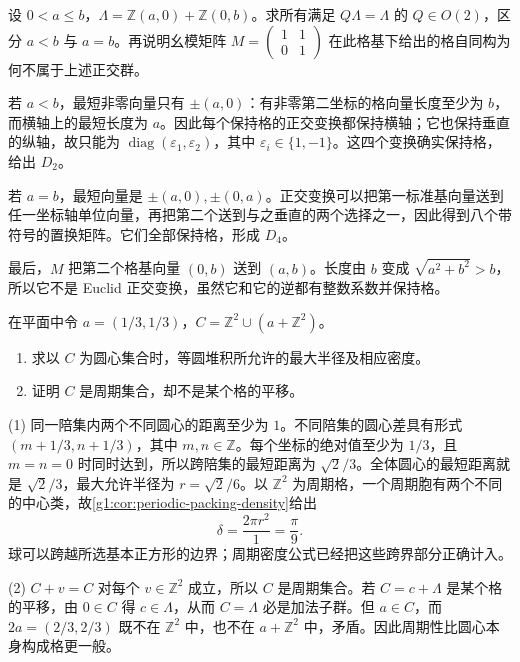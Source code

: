 \begin{exercise}
	\label{g1:ex:rectangular-lattice-point-group}
	设 \(0<a\le b\)，\(\Lambda=\mathbb Z(a,0)+\mathbb Z(0,b)\)。求所有满足 \(Q\Lambda=\Lambda\) 的 \(Q\in O(2)\)，区分 \(a<b\) 与 \(a=b\)。再说明幺模矩阵 \(M=\left(\begin{smallmatrix}1&1\\0&1\end{smallmatrix}\right)\) 在此格基下给出的格自同构为何不属于上述正交群。
\end{exercise}
\begin{solution}
	若 \(a<b\)，最短非零向量只有 \(\pm(a,0)\)：有非零第二坐标的格向量长度至少为 \(b\)，而横轴上的最短长度为 \(a\)。因此每个保持格的正交变换都保持横轴；它也保持垂直的纵轴，故只能为 \(\operatorname{diag}(\varepsilon_1,\varepsilon_2)\)，其中 \(\varepsilon_i\in\{1,-1\}\)。这四个变换确实保持格，给出 \(D_2\)。

	若 \(a=b\)，最短向量是 \(\pm(a,0),\pm(0,a)\)。正交变换可以把第一标准基向量送到任一坐标轴单位向量，再把第二个送到与之垂直的两个选择之一，因此得到八个带符号的置换矩阵。它们全部保持格，形成 \(D_4\)。

	最后，\(M\) 把第二个格基向量 \((0,b)\) 送到 \((a,b)\)。长度由 \(b\) 变成 \(\sqrt{a^2+b^2}>b\)，所以它不是 Euclid 正交变换，虽然它和它的逆都有整数系数并保持格。
\end{solution}

\begin{exercise}
	\label{g1:ex:periodic-nonlattice-packing}
	在平面中令 \(a=(1/3,1/3)\)，\(C=\mathbb Z^2\cup(a+\mathbb Z^2)\)。
	\begin{enumerate}
		\item 求以 \(C\) 为圆心集合时，等圆堆积所允许的最大半径及相应密度。
		\item 证明 \(C\) 是周期集合，却不是某个格的平移。
	\end{enumerate}
\end{exercise}
\begin{solution}
	(1) 同一陪集内两个不同圆心的距离至少为 \(1\)。不同陪集的圆心差具有形式 \((m+1/3,n+1/3)\)，其中 \(m,n\in\mathbb Z\)。每个坐标的绝对值至少为 \(1/3\)，且 \(m=n=0\) 时同时达到，所以跨陪集的最短距离为 \(\sqrt2/3\)。全体圆心的最短距离就是 \(\sqrt2/3\)，最大允许半径为 \(r=\sqrt2/6\)。以 \(\mathbb Z^2\) 为周期格，一个周期胞有两个不同的中心类，故\cref{g1:cor:periodic-packing-density}给出
	\[
		\delta=\frac{2\pi r^2}{1}=\frac\pi9.
	\]
	球可以跨越所选基本正方形的边界；周期密度公式已经把这些跨界部分正确计入。

	(2) \(C+v=C\) 对每个 \(v\in\mathbb Z^2\) 成立，所以 \(C\) 是周期集合。若 \(C=c+\Lambda\) 是某个格的平移，由 \(0\in C\) 得 \(c\in\Lambda\)，从而 \(C=\Lambda\) 必是加法子群。但 \(a\in C\)，而 \(2a=(2/3,2/3)\) 既不在 \(\mathbb Z^2\) 中，也不在 \(a+\mathbb Z^2\) 中，矛盾。因此周期性比圆心本身构成格更一般。
\end{solution}


